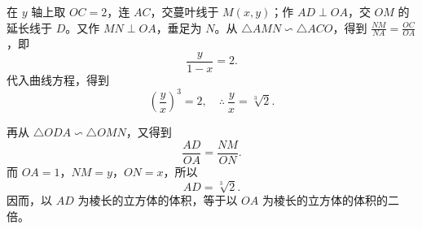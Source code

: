 \hfill
\begin{minipage}[t]{0.55\textwidth}
  \vspace{0pt}
  \hspace{2em}在 $y$ 轴上取 $OC=2$，连 $AC$，交蔓叶线于 $M(x,y)$；作 $AD\perp OA$，交 $OM$ 的延长线于 $D$。又作 $MN\perp OA$，垂足为 $N$。从 $\triangle AMN \backsim \triangle ACO$，得到 $\frac{NM}{NA}=\frac{OC}{OA}$，即
  \[
    \frac{y}{1-x} = 2.
  \]
  代入曲线方程，得到
  \[
    \left(\frac{y}{x}\right)^3 = 2,\quad \therefore\ \frac{y}{x} = \sqrt[3]{2}.
  \]
\end{minipage}

\medskip
\noindent
再从 $\triangle ODA \backsim \triangle OMN$，又得到
\[
  \frac{AD}{OA} = \frac{NM}{ON}.
\]
而 $OA=1$，$NM=y$，$ON=x$，所以
\[
  AD = \sqrt[3]{2}.
\]
因而，以 $AD$ 为棱长的立方体的体积，等于以 $OA$ 为棱长的立方体的体积的二倍。
